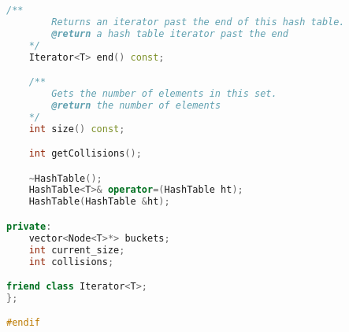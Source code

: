 \documentclass[letterpaper, 11pt]{article}
\begin{document}
\begin{lstlisting}[language=c++, caption=hashtable.h]
    /**
        Returns an iterator past the end of this hash table.
        @return a hash table iterator past the end
    */
    Iterator<T> end() const;

    /**
        Gets the number of elements in this set.
        @return the number of elements
    */
    int size() const;

    int getCollisions();

    ~HashTable();
    HashTable<T>& operator=(HashTable ht);
    HashTable(HashTable &ht);

private:
    vector<Node<T>*> buckets;
    int current_size;   
    int collisions;

friend class Iterator<T>;
};

#endif    
\end{lstlisting}
\end{document}
